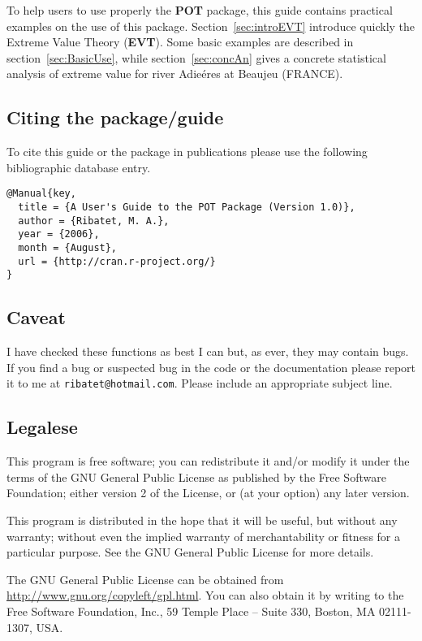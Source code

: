 \documentclass[11pt,a4paper]{article}
\numberwithin{equation}{section}
\theoremstyle{definition}
\begin{document}
To help users to use properly the \textbf{POT} package, this guide
contains practical examples on the use of this
package. Section~\ref{sec:introEVT} introduce quickly the Extreme
Value Theory (\textbf{EVT}). Some basic examples are described in
section~\ref{sec:BasicUse}, while section~\ref{sec:concAn} gives a
concrete statistical analysis of extreme value for river Adie\'eres at
Beaujeu (FRANCE).

\subsection{Citing the package/guide}

To cite this guide or the package in publications please use the
following bibliographic database entry.
\begin{verbatim}
@Manual{key,
  title = {A User's Guide to the POT Package (Version 1.0)},
  author = {Ribatet, M. A.},
  year = {2006},
  month = {August},
  url = {http://cran.r-project.org/}
}
\end{verbatim}

\subsection{Caveat}

I have checked these functions as best I can but, as ever, they may
contain bugs.  If you find a bug or suspected bug in the code or the
documentation please report it to me at \verb+ribatet@hotmail.com+.
Please include an appropriate subject line.

\subsection{Legalese}

This program is free software; you can redistribute it and/or modify
it under the terms of the GNU General Public License as published by
the Free Software Foundation; either version 2 of the License, or (at
your option) any later version.

This program is distributed in the hope that it will be useful, but
without any warranty; without even the implied warranty of
merchantability or fitness for a particular purpose.  See the GNU
General Public License for more details.

The GNU General Public License can be obtained from
\url{http://www.gnu.org/copyleft/gpl.html}.  You can also obtain it by
writing to the Free Software Foundation, Inc., 59 Temple Place --
Suite 330, Boston, MA 02111-1307, USA.
\end{document}
